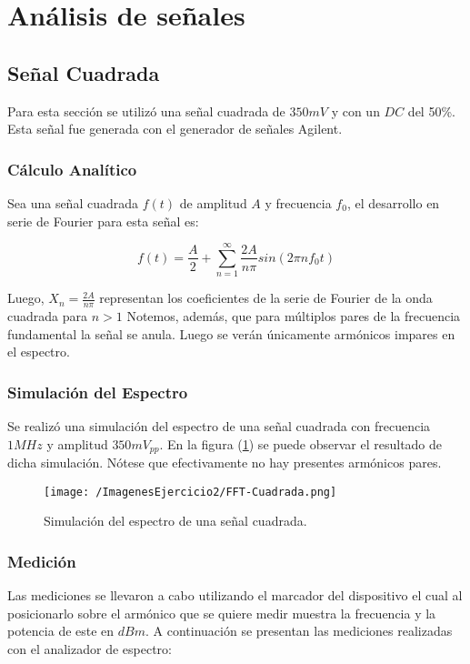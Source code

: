 \section{Análisis de señales}

\subsection{Señal Cuadrada}

Para esta sección se utilizó una señal cuadrada de $350mV$ y con un $DC$ del 50\%. Esta señal fue generada con el generador de señales Agilent.

\subsubsection{Cálculo Analítico}

Sea una señal cuadrada $f(t)$ de amplitud $A$ y frecuencia $f_0$, el desarrollo en serie de Fourier para esta señal es:

\begin{equation}
    f(t)=\frac{A}{2}+\sum_{n=1}^{\infty} \frac{2A}{n\pi}sin(2\pi n f_0t)
    \label{eq:fouriercuadrada}
\end{equation}

Luego, $X_n=\frac{2A}{n\pi}$ representan los coeficientes de la serie de Fourier de la onda cuadrada para $n>1$ Notemos, además, que para múltiplos pares de la frecuencia fundamental la señal se anula. Luego se verán únicamente armónicos impares en el espectro.

\subsubsection{Simulación del Espectro}

Se realizó una simulación del espectro de una señal cuadrada con frecuencia $1 MHz$ y amplitud $350 mV_{pp}$. En la figura (\ref{fig:simcuad}) se puede observar el resultado de dicha simulación. Nótese que efectivamente no hay presentes armónicos pares.

\begin{figure}[H]
	\centering
	\texttt{[image: /ImagenesEjercicio2/FFT-Cuadrada.png]}
\caption{Simulación del espectro de una señal cuadrada.}
	\label{fig:simcuad}
\end{figure}


\subsubsection{Medición}
Las mediciones se llevaron a cabo utilizando el marcador del dispositivo el cual al posicionarlo sobre el armónico que se quiere medir muestra la frecuencia y la potencia de este en $dBm$. A continuación se presentan las mediciones realizadas con el analizador de espectro:

